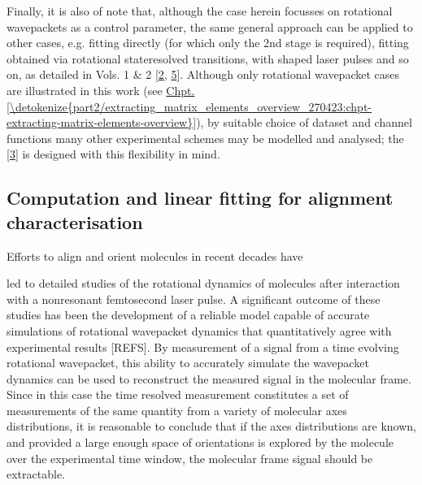 \documentclass[letterpaper,table,10pt,english]{jupyterBook}
\begin{document}
\sphinxAtStartPar
Finally, it is also of note that, although the case herein focusses on rotational wavepackets as a control parameter, the same general approach can be applied to other cases, e.g. fitting {\hyperref[\detokenize{backmatter/glossary:term-MF}]{}} {\hyperref[\detokenize{backmatter/glossary:term-PADs}]{}} directly (for which only the 2nd stage is required), fitting {\hyperref[\detokenize{backmatter/glossary:term-PADs}]{}} obtained via rotational state\sphinxhyphen{}resolved transitions, with shaped laser pulses and so on, as detailed in  Vols. 1 \& 2 {[}\hyperlink{cite.backmatter/bibliography:id663}{2}, \hyperlink{cite.backmatter/bibliography:id664}{5}{]}. Although only rotational wavepacket cases are illustrated in this work (see \hyperref[\detokenize{part2/extracting_matrix_elements_overview_270423:chpt-extracting-matrix-elements-overview}]{Chpt.\@ \ref{\detokenize{part2/extracting_matrix_elements_overview_270423:chpt-extracting-matrix-elements-overview}}}), by suitable choice of dataset and channel functions many other experimental schemes may be modelled and analysed; the  {[}\hyperlink{cite.backmatter/bibliography:id668}{3}{]} is designed with  this flexibility in mind.


\subsection{Computation and linear fitting for alignment characterisation}
\label{\detokenize{part1/numerics_070723:computation-and-linear-fitting-for-alignment-characterisation}}\label{\detokenize{part1/numerics_070723:sect-numerics-alignment-retrieval}}
\sphinxAtStartPar
Efforts to align and orient molecules in recent decades have

\sphinxAtStartPar
led to detailed studies of the rotational dynamics of molecules after interaction with a non\sphinxhyphen{}resonant femtosecond laser pulse. A significant outcome of these studies has been the development of a reliable model capable of accurate simulations of rotational wavepacket dynamics that quantitatively agree with experimental results {[}REFS{]}. By measurement of a signal from a time evolving rotational wavepacket, this ability to accurately simulate the wavepacket dynamics can be used to reconstruct the measured signal in the molecular frame. Since in this case the time resolved measurement constitutes a set of measurements of the same quantity from a variety of molecular axes distributions, it is reasonable to conclude that if the axes distributions are known, and provided a large enough space of orientations is explored by the molecule over the experimental time window, the molecular frame signal should be extractable.
\end{document}
